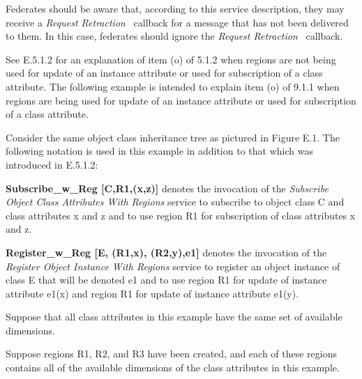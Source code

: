 \begin{annexstdpage}

    Federates should be aware that, according to this service description, they may receive a \textit{Request Retraction} \rtiinitiated\ callback for a message that has not been delivered to them. In this case, federates should ignore the \textit{Request Retraction} \rtiinitiated\ callback.



    See E.5.1.2 for an explanation of item (o) of 5.1.2 when regions are not being used for update of an instance attribute or used for subscription of a class attribute. The following example is intended to explain item (o) of 9.1.1 when regions are being used for update of an instance attribute or used for subscription of a class attribute.

    Consider the same object class inheritance tree as pictured in Figure E.1. The following notation is used in this example in addition to that which was introduced in E.5.1.2:

    \begin{stddashlist}
        \item \textbf{Subscribe\_w\_Reg [C,R1,(x,z)]} denotes the invocation of the \textit{Subscribe Object Class Attributes With Regions} service to subscribe to object class C and class attributes x and z and to use region R1 for subscription of class attributes x and z.
        \item \textbf{Register\_w\_Reg [E, (R1,x), (R2,y),e1]} denotes the invocation of the \textit{Register Object Instance With Regions} service to register an object instance of class E that will be denoted e1 and to use region R1 for update of instance attribute e1(x) and region R1 for update of instance attribute e1(y).
    \end{stddashlist}

    Suppose that all class attributes in this example have the same set of available dimensions.

    Suppose regions R1, R2, and R3 have been created, and each of these regions contains all of the available dimensions of the class attributes in this example.


\end{annexstdpage}
